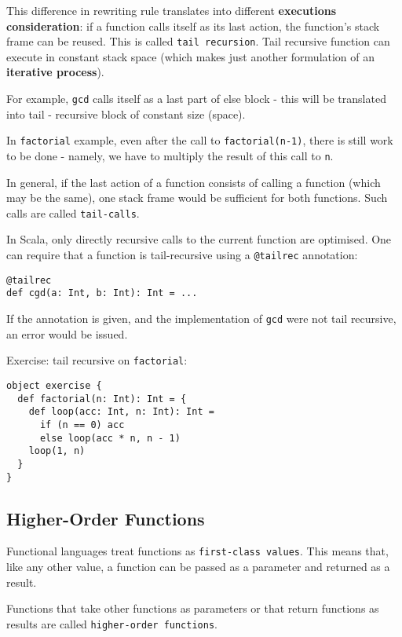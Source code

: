 \documentclass{scrartcl}
\newcommand{\term}[1]{\verb~#1~} %
\begin{document}
This difference in rewriting rule translates into different {\bf executions
  consideration}: if a function calls itself as its last action, the function's
stack frame can be reused. This is called \term{tail recursion}. Tail recursive
function can execute in constant stack space (which makes just another
formulation of an {\bf iterative process}).

For example, \lstinline|gcd| calls itself as a last part of else block - this
will be translated into tail - recursive block of constant size (space).

In \lstinline|factorial| example, even after the call to
\lstinline|factorial(n-1)|, there is still work to be done - namely, we have to
multiply the result of this call to \lstinline|n|.

In general, if the last action of a function consists of calling a function
(which may be the same), one stack frame would be sufficient for both functions.
Such calls are called \term{tail-calls}.

In Scala, only directly recursive calls to the current function are optimised.
One can require that a function is tail-recursive using a \lstinline|@tailrec|
annotation:
\begin{lstlisting}
@tailrec
def cgd(a: Int, b: Int): Int = ...
\end{lstlisting}

If the annotation is given, and the implementation of \lstinline|gcd| were not
tail recursive, an error would be issued.

Exercise: tail recursive on \lstinline|factorial|:
\begin{lstlisting}
object exercise {
  def factorial(n: Int): Int = {
    def loop(acc: Int, n: Int): Int =
      if (n == 0) acc
      else loop(acc * n, n - 1)
    loop(1, n)
  }
}
\end{lstlisting}

\subsection{Higher-Order Functions}
\label{sec:Lection2-HigherOrderFunctions}

Functional languages treat functions as \term{first-class values}. This means
that, like any other value, a function can be passed as a parameter and returned
as a result.

Functions that take other functions as parameters or that return functions as
results are called \term{higher-order functions}.
\end{document}
